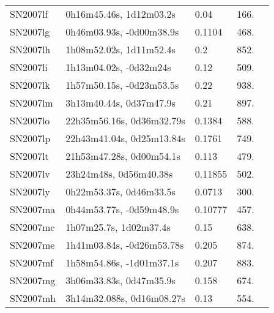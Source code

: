 \begin{longtable}{lllll}
         SN2007lf &        0h16m45.46s, 1d12m03.2s &     0.04 &           166. &    \citet{2007CBET.1102A...1B} \\
         SN2007lg &       0h46m03.93s, -0d00m38.9s &   0.1104 &           468. &    \citet{2011ApJ...740...92G} \\
         SN2007lh &        1h08m52.02s, 1d11m52.4s &      0.2 &           852. &    \citet{2007CBET.1102A...1B} \\
         SN2007li &         1h13m04.02s, -0d32m24s &     0.12 &           509. &    \citet{2010ApJ...713.1026D} \\
         SN2007lk &       1h57m50.15s, -0d23m53.5s &     0.22 &           938. &    \citet{2007CBET.1102A...1B} \\
         SN2007lm &        3h13m40.44s, 0d37m47.9s &     0.21 &           897. &    \citet{2007CBET.1102A...1B} \\
         SN2007lo &      22h35m56.16s, 0d36m32.79s &   0.1384 &           588. &    \citet{2011ApJ...740...92G} \\
         SN2007lp &      22h43m41.04s, 0d25m13.84s &   0.1761 &           749. &    \citet{2011ApJ...740...92G} \\
         SN2007lt &       21h53m47.28s, 0d00m54.1s &    0.113 &           479. &    \citet{2011ApJ...740...92G} \\
         SN2007lv &         23h24m48s, 0d56m40.38s &  0.11855 &           502. &    \citet{2003SDSS1.C...0000:} \\
         SN2007ly &        0h22m53.37s, 0d46m33.5s &   0.0713 &           300. &    \citet{2011ApJ...740...92G} \\
         SN2007ma &       0h44m53.77s, -0d59m48.9s &  0.10777 &           457. &    \citet{2016SDSSD.C...0000:} \\
         SN2007mc &         1h07m25.7s, 1d02m37.4s &     0.15 &           638. &    \citet{2007CBET.1102A...1B} \\
         SN2007me &      1h41m03.84s, -0d26m53.78s &    0.205 &           874. &    \citet{2010ApJ...713.1026D} \\
         SN2007mf &       1h58m54.86s, -1d01m37.1s &    0.207 &           883. &    \citet{2010ApJ...713.1026D} \\
         SN2007mg &        3h06m33.83s, 0d47m35.9s &    0.158 &           674. &    \citet{2010ApJ...713.1026D} \\
         SN2007mh &      3h14m32.088s, 0d16m08.27s &     0.13 &           554. &    \citet{2007CBET.1102A...1B} \\

\end{longtable}
